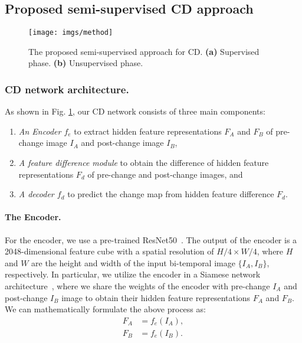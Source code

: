 \documentclass[runningheads]{llncs}
\begin{document}
\subsection{Proposed semi-supervised CD approach}
\begin{figure}[!tb]
    \centering
    \label{fig:network}
    \texttt{[image: imgs/method]}
    \caption{The proposed semi-supervised approach for CD. \textbf{(a)} Supervised phase. \textbf{(b)} Unsupervised phase. \vspace{-5mm}}
\end{figure}

\subsubsection{CD network architecture.} As shown in Fig. \ref{fig:network}, our CD network consists of three main components:
\begin{enumerate}
     \item \textit{An Encoder $f_{e}$} to extract hidden feature representations $F_A$ and $F_B$ of pre-change image $I_A$ and post-change image $I_B$,
     \item \textit{A feature difference module} to obtain the difference of hidden feature representations $F_d$ of pre-change and post-change images, and
     \item \textit{A decoder $f_d$} to predict the change map from hidden feature difference $F_d$.
 \end{enumerate}
\paragraph{The Encoder.} For the encoder, we use a  pre-trained ResNet50~\cite{he2016deep}. The output of the encoder is a 2048-dimensional feature cube with a spatial resolution of $H/4  \times W/4$, where $H$ and $W$ are the height and width of the input bi-temporal image $\{I_A, I_B\}$, respectively. In particular, we utilize the encoder in a Siamese network architecture~\cite{bromley1993signature}, where we share the weights of the encoder with pre-change $I_A$ and post-change $I_B$ image to obtain their hidden feature representations $F_A$ and $F_B$. We can mathematically formulate the above process as:
\setlength{\belowdisplayskip}{0pt} \setlength{\belowdisplayshortskip}{0pt}
\setlength{\abovedisplayskip}{0pt} \setlength{\abovedisplayshortskip}{0pt}
\begin{align}
    F_A &= f_e(I_A),\\
    F_B &= f_e(I_B).
\end{align}
\end{document}
